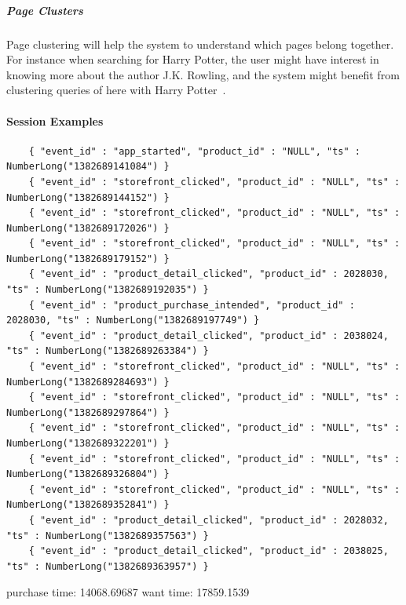         \subparagraph{Page Clusters} %
        \label{subp:page_clusters}
            Page clustering will help the system to understand which pages belong together.
            For instance when searching for Harry Potter, the user might have interest in knowing more about the author J.K. Rowling, and the system might benefit from clustering queries of here with Harry Potter~\cite{Zhang:2006:MSE:1135777.1136004}.



\paragraph{Session Examples} %
\label{par:session_examples}

\begin{lstlisting}
    { "event_id" : "app_started", "product_id" : "NULL", "ts" : NumberLong("1382689141084") }
    { "event_id" : "storefront_clicked", "product_id" : "NULL", "ts" : NumberLong("1382689144152") }
    { "event_id" : "storefront_clicked", "product_id" : "NULL", "ts" : NumberLong("1382689172026") }
    { "event_id" : "storefront_clicked", "product_id" : "NULL", "ts" : NumberLong("1382689179152") }
    { "event_id" : "product_detail_clicked", "product_id" : 2028030, "ts" : NumberLong("1382689192035") }
    { "event_id" : "product_purchase_intended", "product_id" : 2028030, "ts" : NumberLong("1382689197749") }
    { "event_id" : "product_detail_clicked", "product_id" : 2038024, "ts" : NumberLong("1382689263384") }
    { "event_id" : "storefront_clicked", "product_id" : "NULL", "ts" : NumberLong("1382689284693") }
    { "event_id" : "storefront_clicked", "product_id" : "NULL", "ts" : NumberLong("1382689297864") }
    { "event_id" : "storefront_clicked", "product_id" : "NULL", "ts" : NumberLong("1382689322201") }
    { "event_id" : "storefront_clicked", "product_id" : "NULL", "ts" : NumberLong("1382689326804") }
    { "event_id" : "storefront_clicked", "product_id" : "NULL", "ts" : NumberLong("1382689352841") }
    { "event_id" : "product_detail_clicked", "product_id" : 2028032, "ts" : NumberLong("1382689357563") }
    { "event_id" : "product_detail_clicked", "product_id" : 2038025, "ts" : NumberLong("1382689363957") }
\end{lstlisting}

purchase time: 14068.69687
want time: 17859.1539

